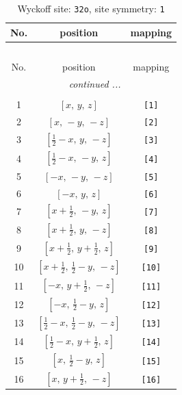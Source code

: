\documentclass[fleqn,8pt]{jsarticle}
\begin{document}
\renewcommand{\arraystretch}{1.2}
\begin{longtable}{ccc}
\caption{Wyckoff site: {\tt 32o}, site symmetry: {\tt 1}}
 \\
 \hline \hline
No. & position & mapping \\ \hline \endfirsthead

\multicolumn{2}{l}{\tablename\ \thetable{}} \\
 \hline \hline
No. & position & mapping \\ \hline \endhead

 \hline \hline
\multicolumn{2}{r}{\footnotesize\it continued ...} \\ \endfoot

 \hline \hline
\multicolumn{2}{r}{} \\ \endlastfoot

1 & $\left[ x,\, y,\, z \right]$ & {\tt [1]} \\ \hline
2 & $\left[ x,\, - y,\, - z \right]$ & {\tt [2]} \\ \hline
3 & $\left[ \frac{1}{2} - x,\, y,\, - z \right]$ & {\tt [3]} \\ \hline
4 & $\left[ \frac{1}{2} - x,\, - y,\, z \right]$ & {\tt [4]} \\ \hline
5 & $\left[ - x,\, - y,\, - z \right]$ & {\tt [5]} \\ \hline
6 & $\left[ - x,\, y,\, z \right]$ & {\tt [6]} \\ \hline
7 & $\left[ x + \frac{1}{2},\, - y,\, z \right]$ & {\tt [7]} \\ \hline
8 & $\left[ x + \frac{1}{2},\, y,\, - z \right]$ & {\tt [8]} \\ \hline
9 & $\left[ x + \frac{1}{2},\, y + \frac{1}{2},\, z \right]$ & {\tt [9]} \\ \hline
10 & $\left[ x + \frac{1}{2},\, \frac{1}{2} - y,\, - z \right]$ & {\tt [10]} \\ \hline
11 & $\left[ - x,\, y + \frac{1}{2},\, - z \right]$ & {\tt [11]} \\ \hline
12 & $\left[ - x,\, \frac{1}{2} - y,\, z \right]$ & {\tt [12]} \\ \hline
13 & $\left[ \frac{1}{2} - x,\, \frac{1}{2} - y,\, - z \right]$ & {\tt [13]} \\ \hline
14 & $\left[ \frac{1}{2} - x,\, y + \frac{1}{2},\, z \right]$ & {\tt [14]} \\ \hline
15 & $\left[ x,\, \frac{1}{2} - y,\, z \right]$ & {\tt [15]} \\ \hline
16 & $\left[ x,\, y + \frac{1}{2},\, - z \right]$ & {\tt [16]} \\ \hline

\end{longtable}
\end{document}
